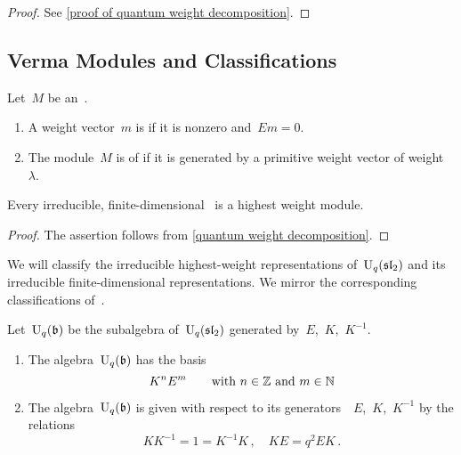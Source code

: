 \documentclass[a4paper, 11pt, oneside]{scrartcl}
\begin{document}
\begin{proof}
  See \cref{proof of quantum weight decomposition}.
\end{proof}



\subsection{Verma Modules and Classifications}

\begin{definition}
  Let~$M$ be an~.
  \begin{enumerate}
    \item
      A weight vector~$m$ is  if it is nonzero and~$Em = 0$.
    \item
      The module~$M$ is of  if it is generated by a primitive weight vector of weight~$\lambda$.
  \end{enumerate}
\end{definition}

\begin{proposition}
  Every irreducible, finite-dimensional~ is a highest weight module.
\end{proposition}

\begin{proof}
  The assertion follows from \cref{quantum weight decomposition}.
\end{proof}

We will classify the irreducible highest-weight representations of~$\operatorname{U}_q(\mathfrak{sl}_2)$ and its irreducible finite-dimensional representations.
We mirror the corresponding classifications of~.

\begin{definition}
  Let~$\operatorname{U}_q(\mathfrak{b})$ be the subalgebra of~$\operatorname{U}_q(\mathfrak{sl}_2)$ generated by~$E$,~$K$,~$K^{-1}$.
\end{definition}

\begin{proposition}
  \label{quantum borel}
  \leavevmode
  \begin{enumerate}
    \item
      The algebra~$\operatorname{U}_q(\mathfrak{b})$ has the basis
      \[
        K^n E^m
        \qquad
        \text{with~$n \in \mathbb{Z}$ and~$m \in \mathbb{N}$}
      \]
    \item
      The algebra~$\operatorname{U}_q(\mathfrak{b})$ is given with respect to its generators~~$E$,~$K$,~$K^{-1}$ by the relations
      \[
        K K^{-1} = 1 = K^{-1} K \,,
        \quad
        K E = q^2 E K \,.
      \]
  \end{enumerate}
\end{proposition}
\end{document}
